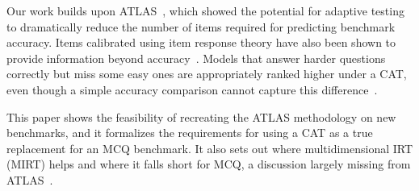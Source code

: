 Our work builds upon ATLAS~\cite{li2025atlas}, which showed the potential for
adaptive testing to dramatically reduce the number of items required for
predicting benchmark accuracy. Items calibrated using item response theory have
also been shown to provide information beyond
accuracy~\cite{lalor2016, rodriguez2021, vania2021}. Models that answer harder
questions correctly but miss some easy ones are appropriately ranked higher
under a CAT, even though a simple accuracy comparison cannot capture this
difference~\cite{li2025atlas}.

This paper shows the feasibility of recreating the ATLAS methodology on new
benchmarks, and it formalizes the requirements for using a CAT as a true
replacement for an MCQ benchmark. It also sets out where multidimensional IRT
(MIRT) helps and where it falls short for MCQ, a discussion largely missing
from ATLAS~\cite{li2025atlas}.
